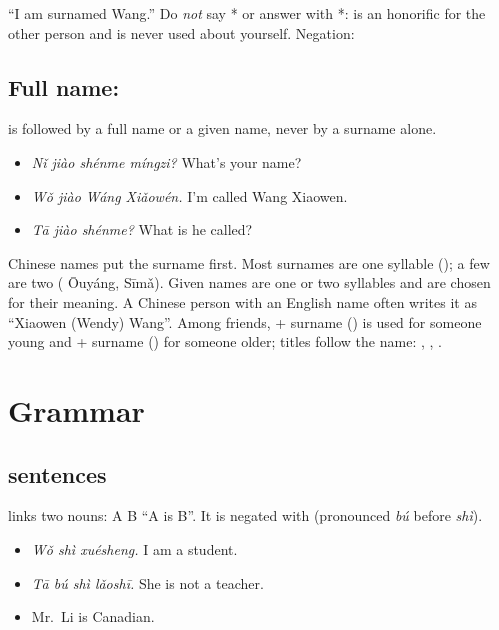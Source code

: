 \begin{important}[\zh{姓} is a verb]
 ``I am surnamed Wang.'' Do \emph{not} say * or answer
 with *:  is an honorific for the other person and is never
used about yourself. Negation: 
\end{important}

\subsection{Full name: }

 is followed by a full name or a given name, never by a surname alone.
\begin{itemize}
  \item {} \emph{Nǐ jiào shénme míngzi?} What's your name?
  \item {} \emph{Wǒ jiào Wáng Xiǎowén.} I'm called Wang Xiaowen.
  \item {} \emph{Tā jiào shénme?} What is he called?
\end{itemize}

\begin{aside}
Chinese names put the surname first. Most surnames are one syllable ();
a few are two ( Ōuyáng,  Sīmǎ). Given names are one or two syllables
and are chosen for their meaning. A Chinese person with an English name often writes
it as ``Xiaowen (Wendy) Wang''. Among friends,  + surname () is used for
someone young and  + surname () for someone older; titles follow the
name: , , .
\end{aside}

\section{Grammar}

\subsection{ sentences}

 links two nouns: A  B ``A is B''. It is negated with 
(pronounced \emph{bú} before \emph{shì}).
\begin{itemize}
  \item {} \emph{Wǒ shì xuésheng.} I am a student.
  \item {} \emph{Tā bú shì lǎoshī.} She is not a teacher.
  \item {} Mr.\ Li is Canadian.
\end{itemize}

